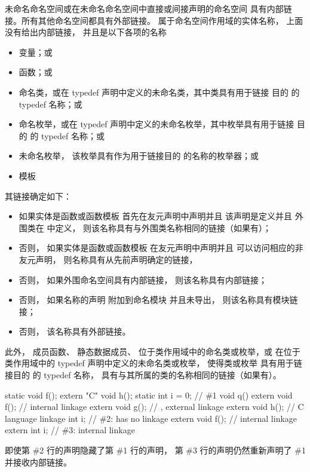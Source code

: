 \pnum
未命名命名空间或在未命名命名空间中直接或间接声明的命名空间
具有内部链接。所有其他命名空间都具有外部链接。
属于命名空间作用域的实体名称，
上面没有给出内部链接，
并且是以下各项的名称
\begin{itemize}
\item 变量；或
\item 函数；或
\item
{}%
命名类，或在
typedef 声明中定义的未命名类，其中类具有用于链接
目的 的 typedef 名称；或
\item
{}%
命名枚举，或在
typedef 声明中定义的未命名枚举，其中枚举具有用于链接
目的 的 typedef 名称；或
\item 未命名枚举，
该枚举具有作为用于链接目的 的名称的枚举器；或
\item 模板
\end{itemize}
其链接确定如下：
\begin{itemize}
\item
{}%
如果实体是函数或函数模板
首先在友元声明中声明并且
该声明是定义并且
外围类在  中定义，
则该名称具有与外围类名称相同的链接（如果有）；
\item
否则，
%
如果实体是函数或函数模板
在友元声明中声明并且
可以访问相应的非友元声明，
则名称具有从先前声明确定的链接，
\item
否则，
如果外围命名空间具有内部链接，
则该名称具有内部链接；
\item
否则，
如果名称的声明
附加到命名模块
并且未导出，
则该名称具有模块链接；
\item
否则，
该名称具有外部链接。
\end{itemize}

\pnum
此外，
成员函数、
静态数据成员、
位于类作用域中的命名类或枚举，或
在位于类作用域中的 typedef 声明中定义的未命名类或枚举，
使得类或枚举
具有用于链接目的 的 typedef 名称，
具有与其所属的类的名称相同的链接（如果有）。

\pnum
\begin{example}
\begin{codeblock}
static void f();
extern "C" void h();
static int i = 0;               // \#1
void q() {
  extern void f();              // internal linkage
  extern void g();              // , external linkage
  extern void h();              // C language linkage
  int i;                        // \#2:  has no linkage
  {
    extern void f();            // internal linkage
    extern int i;               // \#3: internal linkage
  }
}
\end{codeblock}
即使第 \#2 行的声明隐藏了第 \#1 行的声明，
第 \#3 行的声明仍然重新声明了 \#1 并接收内部链接。
\end{example}

